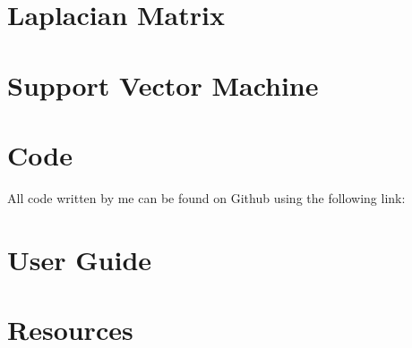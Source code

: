 \documentclass[11pt,a4paper]{article}
\begin{document}
\section{Laplacian Matrix}

\section{Support Vector Machine}
\section{Code}
All code written by me can be found on Github using the following link:

\section{User Guide}

\section{Resources}
\end{document}

